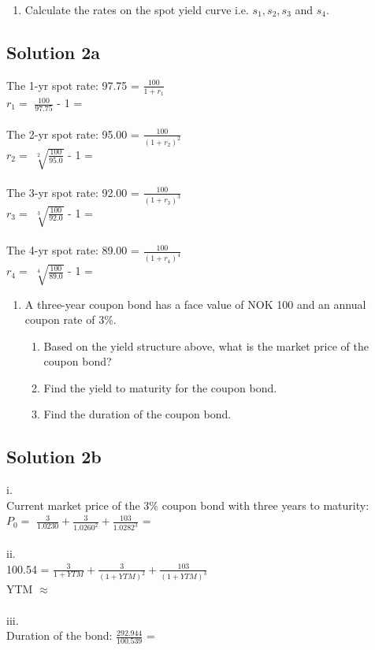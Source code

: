 \documentclass[12]{article}
\begin{document}
\begin{enumerate}
    \item[a)] Calculate the rates on the spot yield curve i.e.  $s_1, s_2, s_3$ and $s_4$.
\end{enumerate}

\color{blue}
\subsection*{Solution 2a}
The 1-yr spot rate: 97.75 = {\Large $ \frac{100}{1 + r_1}$} \\
$r_1 =$ {\Large $ \frac{100}{97.75}$} - 1 = \\
\\
The 2-yr spot rate: 95.00 = {\Large $ \frac{100}{(1 + r_2)^2}$} \\
$r_2 =$ {\Large $ \sqrt[2]{\frac{100}{95.0}}$} - 1 = \\
\\
The 3-yr spot rate: 92.00 = {\Large $ \frac{100}{(1 + r_3)^3}$} \\
$r_3 =$ {\Large $ \sqrt[3]{\frac{100}{92.0}}$} - 1 = \\
\\
The 4-yr spot rate: 89.00 = {\Large $ \frac{100}{(1 + r_4)^4}$} \\
$r_4 =$ {\Large $ \sqrt[4]{\frac{100}{89.0}}$} - 1 = \\




\color{black}
\begin{enumerate}
    \item[b)] A three-year coupon bond has a face value of NOK 100 and an annual coupon rate of 3\%.
    \begin{enumerate}
        \item[i] Based on the yield structure above, what is the market price of the coupon bond?
        \item[ii] Find the yield to maturity for the coupon bond.
        \item[iii] Find the duration of the coupon bond.
    \end{enumerate}
\end{enumerate}


\color{blue}
\subsection*{Solution 2b}
i.\\
Current market price of the 3\% coupon bond with three years to maturity:\\
$P_0 =$ {\Large $\frac{3}{1.0230} + \frac{3}{1.0260^2} + \frac{103}{1.0282^3}$} = \\
\\
ii.\\
100.54 = {\Large $\frac{3}{1+YTM} + \frac{3}{(1+YTM)^2} + \frac{103}{(1+YTM)^3}$}\\
YTM $\approx$ \\
\\
iii.\\
Duration of the bond: {\Large $\frac{292.944}{100.539}$} = \\
\end{document}
